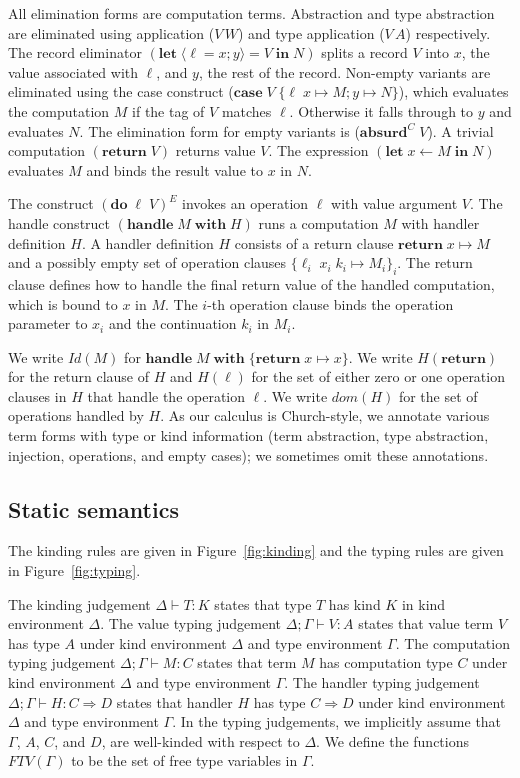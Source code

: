 \documentclass[12pt,mscres,cdtppar,twoside,openright,logo,rightchapter,normalheadings]{infthesis}
\theoremstyle{definition}
\newcommand{\revto}{\ensuremath{\leftarrow}}
\newcommand{\keyw}[1]{\textbf{#1}}
\newcommand{\Handle}{\keyw{handle}}
\newcommand{\With}{\keyw{with}}
\newcommand{\Let}{\keyw{let}}
\newcommand{\In}{\keyw{in}}
\newcommand{\Do}{\keyw{do}}
\newcommand{\Return}{\keyw{return}}
\newcommand{\Case}{\keyw{case}}
\newcommand{\Absurd}{\keyw{absurd}}
\newcommand{\Record}[1]{\ensuremath{\langle #1 \rangle}}
\newcommand{\typ}[2]{#1 \vdash #2}
\newcommand{\typv}[2]{#1 \vdash #2}
\begin{document}
All elimination forms are computation terms. Abstraction and type
abstraction are eliminated using application ($V\,W$) and type
application ($V\,A$) respectively.
%
The record eliminator
$(\Let \; \Record{\ell=x;y} = V \; \In \; N)$ splits a record $V$
into $x$, the value associated with $\ell$, and $y$, the rest of the
record. Non-empty variants are eliminated using the case construct
($\Case\; V\; \{\ell\; x \mapsto M; y \mapsto N\}$), which evaluates
the computation $M$ if the tag of $V$ matches $\ell$. Otherwise it
falls through to $y$ and evaluates $N$.  The elimination form for
empty variants is ($\Absurd^C\; V$). A trivial computation
$(\Return\;V)$ returns value $V$. The expression
$(\Let \; x \revto M \; \In \; N)$ evaluates $M$ and binds the result
value to $x$ in $N$.

The construct $(\Do \; \ell \; V)^E$ invokes an operation $\ell$ with
value argument $V$. The handle construct $(\Handle \; M \; \With \;
H)$ runs a computation $M$ with handler definition $H$. A handler
definition $H$ consists of a return clause $\Return \; x \mapsto M$
and a possibly empty set of operation clauses $\{\ell_i \; x_i \; k_i
\mapsto M_i\}_i$. The return clause defines how to handle the final
return value of the handled computation, which is bound to $x$ in $M$.
%
The $i$-th operation clause binds the operation parameter to $x_i$ and
the continuation $k_i$ in $M_i$.

We write $Id(M)$ for $\Handle \;M\; \With \; \{\Return\;x \mapsto
x\}$.
%
We write $H(\Return)$ for the return clause of $H$ and $H(\ell)$ for
the set of either zero or one operation clauses in $H$ that handle the
operation $\ell$. We write $dom(H)$ for the set of operations handled
by $H$.
%
As our calculus is Church-style, we annotate various term forms with
type or kind information (term abstraction, type abstraction,
injection, operations, and empty cases); we sometimes omit these
annotations.

\subsection{Static semantics}
\label{sec:typing}
The kinding rules are given in Figure~\ref{fig:kinding} and the typing
rules are given in Figure~\ref{fig:typing}.

The kinding judgement $\Delta \vdash T : K$ states that type $T$ has
kind $K$ in kind environment $\Delta$.
%
The value typing judgement $\typv{\Delta;\Gamma}{V : A}$ states that
value term $V$ has type $A$ under kind environment $\Delta$ and type
environment $\Gamma$. The computation typing judgement
$\typ{\Delta;\Gamma}{M : C}$ states that term $M$ has computation type
$C$ under kind environment $\Delta$ and type environment $\Gamma$.
%
The handler typing judgement $\Delta;\Gamma \vdash H : C \Rightarrow
D$ states that handler $H$ has type $C \Rightarrow D$ under kind
environment $\Delta$ and type environment $\Gamma$.
%
In the typing judgements, we implicitly assume that $\Gamma$, $A$,
$C$, and $D$, are well-kinded with respect to $\Delta$. We define the
functions $FTV(\Gamma)$ to be the set of free type variables in
$\Gamma$.
\end{document}
